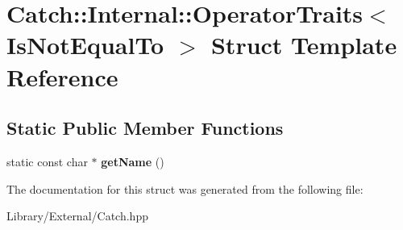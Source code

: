 \hypertarget{struct_catch_1_1_internal_1_1_operator_traits_3_01_is_not_equal_to_01_4}{}\section{Catch\+:\+:Internal\+:\+:Operator\+Traits$<$ Is\+Not\+Equal\+To $>$ Struct Template Reference}
\label{struct_catch_1_1_internal_1_1_operator_traits_3_01_is_not_equal_to_01_4}
\subsection*{Static Public Member Functions}
\begin{DoxyCompactItemize}
\item 
\hypertarget{struct_catch_1_1_internal_1_1_operator_traits_3_01_is_not_equal_to_01_4_a54a795b8bf7c80a9fdbc7b81f39133b4}{}static const char $\ast$ {\bfseries get\+Name} ()\label{struct_catch_1_1_internal_1_1_operator_traits_3_01_is_not_equal_to_01_4_a54a795b8bf7c80a9fdbc7b81f39133b4}

\end{DoxyCompactItemize}


The documentation for this struct was generated from the following file\+:\begin{DoxyCompactItemize}
\item 
Library/\+External/Catch.\+hpp\end{DoxyCompactItemize}
